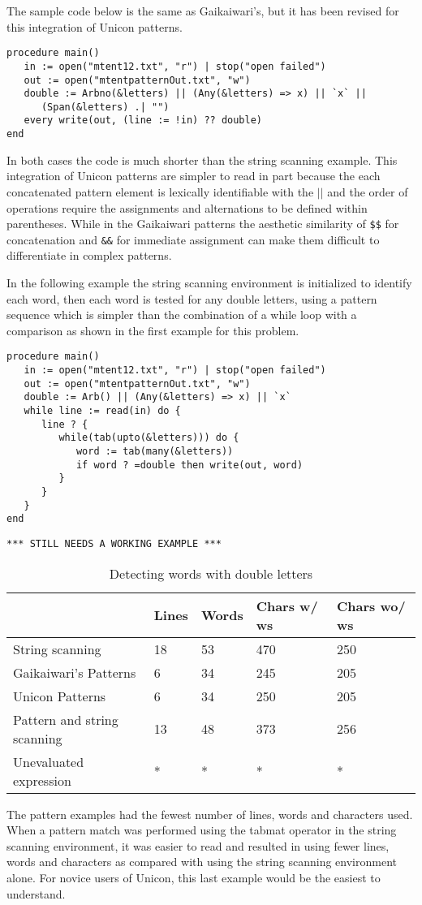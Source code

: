 \documentclass{article}
\begin{document}
The sample code below is the same as Gaikaiwari's, but it has been revised for this integration of Unicon patterns.
\begin{verbatim}
procedure main()
   in := open("mtent12.txt", "r") | stop("open failed")
   out := open("mtentpatternOut.txt", "w")
   double := Arbno(&letters) || (Any(&letters) => x) || `x` ||
      (Span(&letters) .| "")
   every write(out, (line := !in) ?? double)
end 
\end{verbatim}
In both cases the code is much shorter than the string scanning example.  This integration of Unicon patterns are simpler to read in part because the each concatenated pattern element is lexically identifiable with the \texttt{$||$} and the order of operations require the assignments and alternations to be defined within parentheses.  While in the Gaikaiwari patterns the aesthetic similarity of \texttt{\$\$} for concatenation and \texttt{\&\&} for immediate assignment can make them difficult to differentiate in complex patterns. 

In the following example the string scanning environment is initialized to identify each word, then each word is tested for any double letters, using a pattern sequence which is simpler than the combination of a while loop with a comparison as shown in the first example for this problem.
\begin{verbatim}
procedure main()
   in := open("mtent12.txt", "r") | stop("open failed")
   out := open("mtentpatternOut.txt", "w")
   double := Arb() || (Any(&letters) => x) || `x`
   while line := read(in) do {
      line ? {
         while(tab(upto(&letters))) do {
            word := tab(many(&letters))
            if word ? =double then write(out, word)
         }
      }
   }
end 
\end{verbatim}

\begin{verbatim}
*** STILL NEEDS A WORKING EXAMPLE ***
\end{verbatim}


\begin{table}[ht]
	\caption{Detecting words with double letters}
	\centering
	\begin{tabular}{|l|l|l|l|l|}
		\hline\hline
		 & Lines & Words & Chars w/ ws & Chars wo/ ws\\
		\hline
		String scanning & 18 & 53 & 470 & 250 \\
		Gaikaiwari's Patterns & 6 & 34 & 245 & 205 \\
		Unicon Patterns & 6 & 34 & 250 & 205 \\
		Pattern and string scanning & 13 & 48 & 373 & 256 \\
		Unevaluated expression & * & * & * & * \\
		\hline
	\end{tabular}
\end{table}
The pattern examples had the fewest number of lines, words and characters used.  When a pattern match was performed using the tabmat operator in the string scanning environment, it was easier to read and resulted in using fewer lines, words and characters as compared with using the string scanning environment alone.  For novice users of Unicon, this last example would be the easiest to understand.
\end{document}
